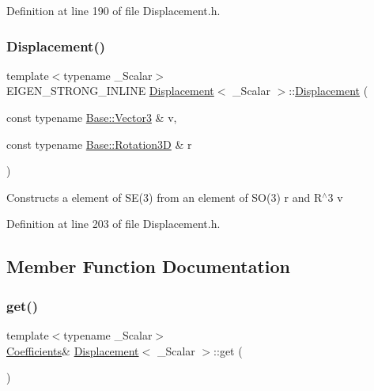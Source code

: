 Definition at line 190 of file Displacement.\+h.

\hypertarget{class_displacement_a65ba493ec0968d840e37f5af1a407e0e}{}\label{class_displacement_a65ba493ec0968d840e37f5af1a407e0e} 
\subsubsection{\texorpdfstring{Displacement()}{Displacement()}\hspace{0.1cm}{\footnotesize\ttfamily [7/7]}}
{\footnotesize\ttfamily template$<$typename \+\_\+\+Scalar$>$ \\
E\+I\+G\+E\+N\+\_\+\+S\+T\+R\+O\+N\+G\+\_\+\+I\+N\+L\+I\+NE \hyperlink{class_displacement}{Displacement}$<$ \+\_\+\+Scalar $>$\+::\hyperlink{class_displacement}{Displacement} (\begin{DoxyParamCaption}\item[{const typename \hyperlink{class_displacement_base_a0b5e3b97de6478fd98bf6aec9730d4c4}{Base\+::\+Vector3} \&}]{v,  }\item[{const typename \hyperlink{class_displacement_base_aca59ea9e7f5fb3b67a489726bced7f4f}{Base\+::\+Rotation3D} \&}]{r }\end{DoxyParamCaption})\hspace{0.3cm}{\ttfamily [inline]}}

Constructs a element of S\+E(3) from an element of S\+O(3) {\ttfamily r} and R$^\wedge$3 {\ttfamily v} 

Definition at line 203 of file Displacement.\+h.



\subsection{Member Function Documentation}
\hypertarget{class_displacement_ac1c0567d40677f692db03770ce80b214}{}\label{class_displacement_ac1c0567d40677f692db03770ce80b214} 
\subsubsection{\texorpdfstring{get()}{get()}\hspace{0.1cm}{\footnotesize\ttfamily [1/2]}}
{\footnotesize\ttfamily template$<$typename \+\_\+\+Scalar$>$ \\
\hyperlink{class_displacement_a995adefd20afdb476cdef2aa7bbc4531}{Coefficients}\& \hyperlink{class_displacement}{Displacement}$<$ \+\_\+\+Scalar $>$\+::get (\begin{DoxyParamCaption}{ }\end{DoxyParamCaption})\hspace{0.3cm}{\ttfamily [inline]}}

